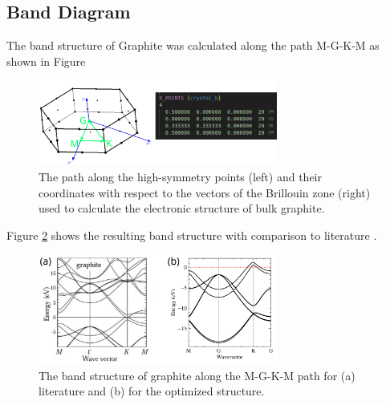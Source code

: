 \documentclass[10pt,a4paper]{labreport}
\begin{document}
\subsection{Band Diagram}
The band structure of Graphite was calculated along the path M-G-K-M as shown in Figure 

\begin{figure}[h]
    \centering 
    \includegraphics[width = 0.7\textwidth]{figs/ass4_kpoints.png}
    \caption{ The path along the high-symmetry points (left) and their coordinates with respect to the vectors of the Brillouin zone (right) used to calculate the electronic structure of bulk graphite.}
    \label{fig:ass4_kpoints}
\end{figure}

Figure \ref{fig:ass4_bands} shows the resulting band structure with comparison to literature \cite{newsonDynamicsCarriersPhotoinjected2010a}. 

\begin{figure}[h]
    \centering 
    \includegraphics[width = 0.7\textwidth]{figs/ass4_bands_both.png}
    \caption{ The band structure of graphite along the M-G-K-M path for (a) literature \cite{newsonDynamicsCarriersPhotoinjected2010a} and (b) for the optimized structure.}
    \label{fig:ass4_bands}
\end{figure}

\newpage

\printbibliography

%   
\end{document}
